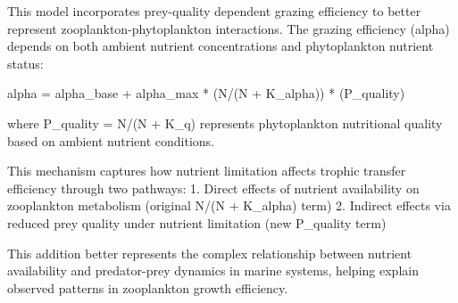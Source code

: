 This model incorporates prey-quality dependent grazing efficiency to better represent zooplankton-phytoplankton interactions. The grazing efficiency (alpha) depends on both ambient nutrient concentrations and phytoplankton nutrient status:

alpha = alpha_base + alpha_max * (N/(N + K_alpha)) * (P_quality)

where P_quality = N/(N + K_q) represents phytoplankton nutritional quality based on ambient nutrient conditions.

This mechanism captures how nutrient limitation affects trophic transfer efficiency through two pathways:
1. Direct effects of nutrient availability on zooplankton metabolism (original N/(N + K_alpha) term)
2. Indirect effects via reduced prey quality under nutrient limitation (new P_quality term)

This addition better represents the complex relationship between nutrient availability and predator-prey dynamics in marine systems, helping explain observed patterns in zooplankton growth efficiency.
